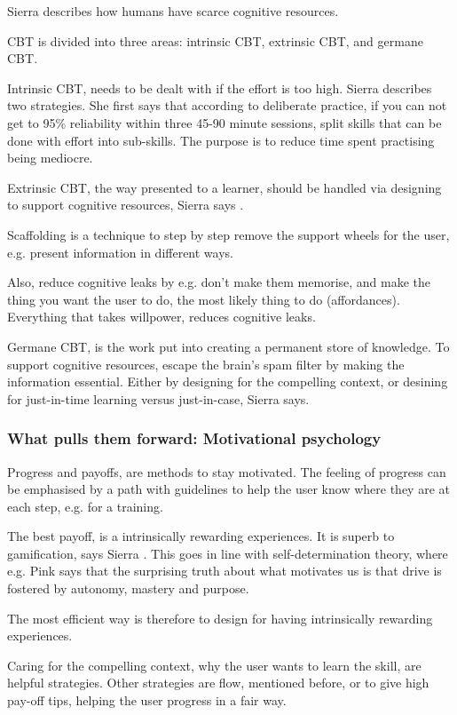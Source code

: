 Sierra \cite{sierra} describes how humans have scarce cognitive resources.

CBT is divided into three areas: intrinsic CBT, extrinsic CBT, and germane CBT.

Intrinsic CBT, needs to be dealt with if the effort is too high. Sierra \cite{sierra}describes two strategies. She first says that according to deliberate practice, if you can not get to 95\% reliability within three 45-90 minute sessions, split skills that can be done with effort into sub-skills. The purpose is to reduce time spent practising being mediocre.

Extrinsic CBT, the way presented to a learner, should be handled via designing to support cognitive resources, Sierra says \cite{sierra}.

Scaffolding is a technique to step by step remove the support wheels for the user, e.g. present information in different ways.

Also, reduce cognitive leaks by e.g. don't make them memorise, and make the thing you want the user to do, the most likely thing to do (affordances). Everything that takes willpower, reduces cognitive leaks.

Germane CBT, is the work put into creating a permanent store of knowledge. To support cognitive resources, escape the brain's spam filter by making the information essential. Either by designing for the compelling context, or desining for just-in-time learning versus just-in-case, Sierra says. \cite{sierra}

\subsubsection{What pulls them forward: Motivational psychology}

Progress and payoffs, are methods to stay motivated. The feeling of progress can be emphasised by a path with guidelines to help the user know where they are at each step, e.g. for a training.

The best payoff, is a intrinsically rewarding experiences. It is superb to gamification, says Sierra \cite{sierra}. This goes in line with self-determination theory, where e.g. Pink \cite{pink} says that the surprising truth about what motivates us is that drive is fostered by autonomy, mastery and purpose.

The most efficient way is therefore to design for having intrinsically rewarding experiences.

Caring for the compelling context, why the user wants to learn the skill, are helpful strategies. Other strategies are flow, mentioned before, or to give high pay-off tips, helping the user progress in a fair way.

